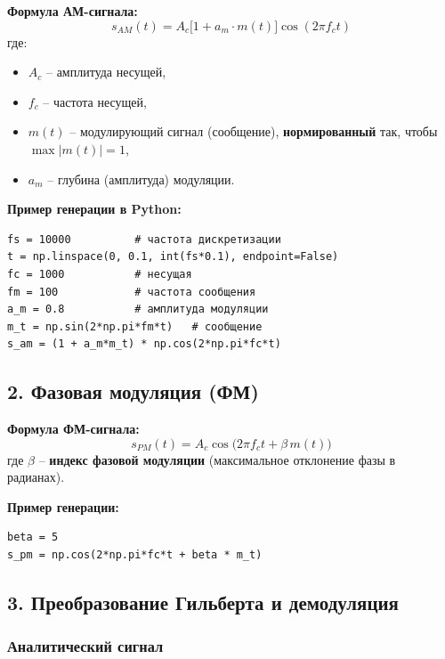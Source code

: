 \documentclass[12pt,a4paper,openany]{book}
\providecommand{\tightlist}{\setlength{\itemsep}{0pt}\setlength{\parskip}{0pt}}
\begin{document}
\textbf{Формула АМ-сигнала:}
\[
s_{AM}(t) = A_c \bigl[1 + a_m\cdot m(t)\bigr] \cos(2\pi f_c t)
\]
где:

\begin{itemize}
\tightlist
\item
  \(A_c\) -- амплитуда несущей,
\item
  \(f_c\) -- частота несущей,
\item
  \(m(t)\) -- модулирующий сигнал (сообщение), \textbf{нормированный} так, чтобы \(\max |m(t)| = 1\),
\item
  \(a_m\) -- глубина (амплитуда) модуляции.
\end{itemize}

\textbf{Пример генерации в Python:}

\begin{Verbatim}[fontsize=\small, breaklines, breakanywhere]
fs = 10000          # частота дискретизации
t = np.linspace(0, 0.1, int(fs*0.1), endpoint=False)
fc = 1000           # несущая
fm = 100            # частота сообщения
a_m = 0.8           # амплитуда модуляции
m_t = np.sin(2*np.pi*fm*t)   # сообщение
s_am = (1 + a_m*m_t) * np.cos(2*np.pi*fc*t)
\end{Verbatim}

\subsection*{2. Фазовая модуляция (ФМ)}

\textbf{Формула ФМ-сигнала:}
\[
s_{PM}(t) = A_c \cos\bigl(2\pi f_c t + \beta\, m(t)\bigr)
\]
где \(\beta\) -- \textbf{индекс фазовой модуляции} (максимальное отклонение фазы в радианах).

\textbf{Пример генерации:}

\begin{Verbatim}[fontsize=\small, breaklines, breakanywhere]
beta = 5
s_pm = np.cos(2*np.pi*fc*t + beta * m_t)
\end{Verbatim}

\subsection*{3. Преобразование Гильберта и демодуляция}

\subsubsection*{Аналитический сигнал}
\end{document}
